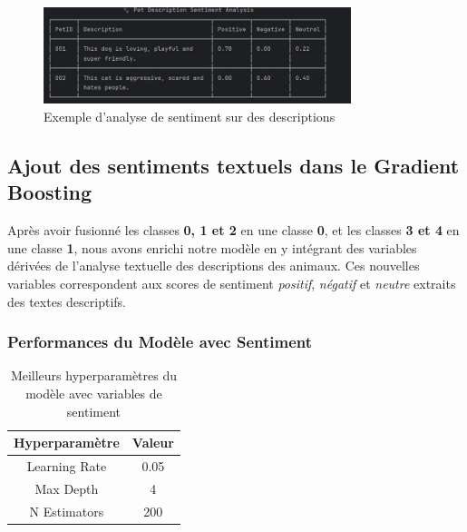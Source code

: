 \documentclass[a4paper,12pt]{article}
\begin{document}
\begin{figure}[H]
    \centering
    \includegraphics[width=0.8\textwidth]{image.jpg}
    \caption{Exemple d'analyse de sentiment sur des descriptions}
    \label{fig:sentiment}
\end{figure}

 
 
 
 
 
 
\subsection{Ajout des sentiments textuels dans le Gradient Boosting}
 
Après avoir fusionné les classes \textbf{0, 1 et 2} en une classe \textbf{0}, et les classes \textbf{3 et 4} en une classe \textbf{1}, nous avons enrichi notre modèle en y intégrant des variables dérivées de l’analyse textuelle des descriptions des animaux. Ces nouvelles variables correspondent aux scores de sentiment \textit{positif}, \textit{négatif} et \textit{neutre} extraits des textes descriptifs.
 
\bigskip
 
\subsubsection{Performances du Modèle avec Sentiment}
 
\begin{table}[H]

\centering

\begin{tabular}{|c|c|}

\hline

\textbf{Hyperparamètre} & \textbf{Valeur} \\ \hline

Learning Rate & 0.05 \\ \hline

Max Depth & 4 \\ \hline

N Estimators & 200 \\ \hline

\end{tabular}

\caption{Meilleurs hyperparamètres du modèle avec variables de sentiment}

\end{table}
 
\end{document}
